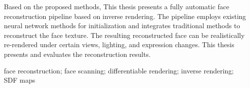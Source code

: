 \documentclass{scutmaster}
\begin{document}
Based on the proposed methods, This thesis presents a fully automatic face reconstruction pipeline based on inverse rendering.
The pipeline employs existing neural network methods for initialization and integrates traditional methods to reconstruct the face texture.
The resulting reconstructed face can be realistically re-rendered under certain views, lighting, and expression changes.
This thesis presents and evaluates the reconstruction results.

 face reconstruction; face scanning; differentiable rendering; inverse rendering; SDF maps

\tableofcontents

\listoffigures

\listoftables

\mainmatter









\end{document}
